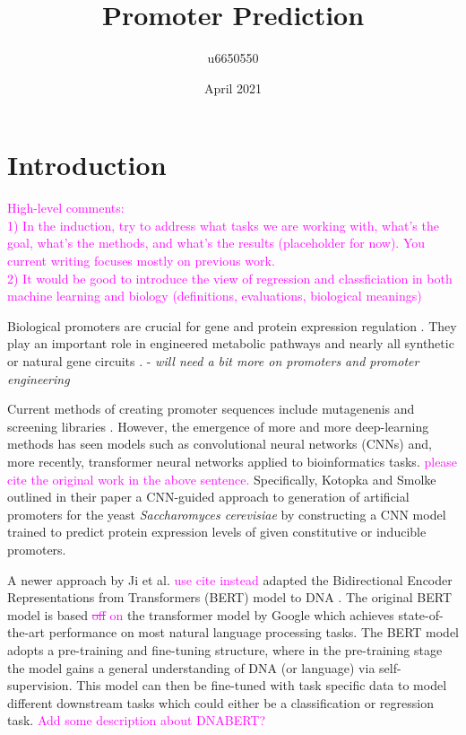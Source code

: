 \documentclass{article}
\title{Promoter Prediction}
\author{u6650550 }
\date{April 2021}
\newcommand{\mengyan}[1]{\textcolor{magenta}{#1}}
\begin{document}
\maketitle
\section{Introduction}

\mengyan{High-level comments: \\
1) In the induction, try to address what tasks we are working with, what's the goal, what's the methods, and what's the results (placeholder for now). You current writing focuses mostly on previous work.\\
2) It would be good to introduce the view of regression and classficiation in both machine learning and biology (definitions, evaluations, biological meanings)}

Biological promoters are crucial for gene and protein expression regulation \cite{smolke2020promoter}. They play an important role in engineered metabolic pathways and nearly all synthetic or natural gene circuits \cite{smolke2020promoter, Redden2015}. - \textit{will need a bit more on promoters and promoter engineering}

Current methods of creating promoter sequences include mutagenenis \cite{Alper12678} and screening libraries \cite{Redden2015}. However, the emergence of more and more deep-learning methods  has seen models such as convolutional neural networks (CNNs) \cite{smolke2020promoter} and, more recently, transformer neural networks \cite{dnabert2020} applied to bioinformatics tasks. 
\mengyan{please cite the original work in the above sentence.}
Specifically, Kotopka and Smolke \cite{smolke2020promoter} outlined in their paper a CNN-guided approach to generation of artificial promoters for the yeast \textit{Saccharomyces cerevisiae} by constructing a CNN model trained to predict protein expression levels of given constitutive or inducible promoters. 

A newer approach by Ji et al. \mengyan{use cite instead} adapted the Bidirectional Encoder Representations from Transformers (BERT) model to DNA \cite{dnabert2020}. The original BERT model is based \mengyan{\st{off} on} the transformer model by Google \cite{vaswani2017attention} which achieves state-of-the-art performance on most natural language processing tasks. 
The BERT model adopts a pre-training and fine-tuning structure, where in the pre-training stage the model gains a general understanding of DNA (or language) via self-supervision. 
This model can then be fine-tuned with task specific data to model different downstream tasks which could either be a classification or regression task.
\mengyan{Add some description about DNABERT?}
\end{document}
